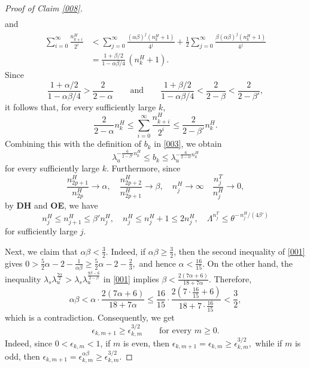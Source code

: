 \documentclass{amsart}
\theoremstyle{plain}
\theoremstyle{definition}
\theoremstyle{remark}
\numberwithin{equation}{section}
\begin{document}
\begin{proof}[Proof of Claim \ref{008}]
\begin{align*}
\end{align*}
and
\begin{align*}
\sum_{i=0}^\infty \frac{n_{k+i}^H}{2^i}
&<
\sum_{j=0}^\infty \frac{(\alpha\beta)^j (n_k^H+1)}{4^j}
+\frac12\sum_{j=0}^\infty \frac{\beta(\alpha\beta)^j (n_k^H+1)}{4^j}\\
&=
\frac{1+\beta/2}{1-\alpha\beta/4}\,(n_k^H+1).
\end{align*}
Since
\[
\frac{1+\alpha/2}{1-\alpha\beta/4}>\frac{2}{2-\alpha}
\qquad\text{and}\qquad
\frac{1+\beta/2}{1-\alpha\beta/4}<\frac{2}{2-\beta}<\frac{2}{2-\beta'},
\]
it follows that, for every sufficiently large $k$,
\[
\frac{2}{2-\alpha} n_k^H
\le
\sum_{i=0}^\infty \frac{n_{k+i}^H}{2^i}
\le
\frac{2}{2-\beta'} n_k^H.
\]
Combining this with the definition of $b_k$ in \eqref{003}, we obtain
\begin{equation}\label{010}
\lambda_u^{-\frac{6}{2-\beta'}n_k^H}\le b_k \le \lambda_u^{-\frac{6}{2-\alpha}n_k^H}
\end{equation}
for every sufficiently large $k$.
Furthermore,
since
\[
\frac{n_{2p+1}^H}{n_{2p}^H}\to \alpha,
\quad
\frac{n_{2p+2}^H}{n_{2p+1}^H}\to \beta,
\quad
n_j^H\to\infty
\quad \frac{n_j^T}{n_j^H}\to 0 , 
\]
by {\bf DH} and {\bf OE}, 
we have
\begin{equation}\label{eq:0314c1}
n_j^H \le n_{j+1}^H\le \beta' n_j^H,
\quad
n_j^H\le n_j^H+1\le 2n_j^H,
\quad\Lambda^{n_j^T}\le \theta^{-\,n_j^H/(4\beta')}
\end{equation}
for sufficiently large $j$.



Next, we claim that
$
\alpha\beta<\frac32.
$
Indeed, if $\alpha\beta\ge \frac32$, then the second inequality of \eqref{001} gives
$
0>\frac52\alpha-2-\frac1{\alpha\beta}\ge \frac52\alpha-2-\frac23,
$
and hence
$
\alpha<\frac{16}{15}.
$
On the other hand, the inequality
$
\lambda_s\lambda_u^{\frac{7\alpha}{2}}
>
\lambda_s\lambda_u^{\frac{9\beta-6}{2-\beta}}
$
in \eqref{001} implies
$
\beta<\frac{2(7\alpha+6)}{18+7\alpha}.
$
Therefore,
\[
\alpha\beta
<
\alpha\cdot \frac{2(7\alpha+6)}{18+7\alpha}
\le
\frac{16}{15}\cdot \frac{2(7\cdot \frac{16}{15}+6)}{18+7\cdot \frac{16}{15}}
<
\frac32,
\]
which is a contradiction.
Consequently, we get
\begin{equation}\label{eq:0314c3}
\epsilon_{k,m+1}\ge \epsilon_{k,m}^{3/2}
\qquad\text{for every }m\ge0.
\end{equation}
Indeed, since $0<\epsilon_{k,m}<1$, if $m$ is even, then
$
\epsilon_{k,m+1}=\epsilon_{k,m}\ge \epsilon_{k,m}^{3/2},
$
while if $m$ is odd, then
$
\epsilon_{k,m+1}=\epsilon_{k,m}^{\alpha\beta}\ge \epsilon_{k,m}^{3/2}.
$


\end{proof}
\end{document}
